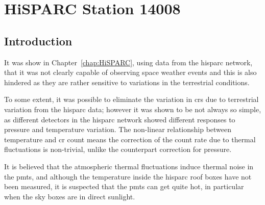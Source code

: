 \chapter{HiSPARC Station 14008}\label{chap:HiSPARC_14008}

\section{Introduction}\label{sec:HS_14008_intro}


%



It was show in Chapter~\ref{chap:HiSPARC}, using data from the \gls{hisparc} network, that it was not clearly capable of observing space weather events and this is also hindered as they are rather sensitive to variations in the terrestrial conditions.

To some extent, it was possible to eliminate the variation in \glspl{cr} due to terrestrial variation from the \gls{hisparc} data; however it was shown to be not always so simple, as different detectors in the \gls{hisparc} network showed different responses to pressure and temperature variation. The non-linear relationship between temperature and \gls{cr} count means the correction of the count rate due to thermal fluctuations is non-trivial, unlike the counterpart correction for pressure. 

It is believed that the atmospheric thermal fluctuations induce thermal noise in the \glspl{pmt}, and although the temperature inside the \gls{hisparc} roof boxes have not been measured, it is suspected that the \glspl{pmt} can get quite hot, in particular when the sky boxes are in direct sunlight.

